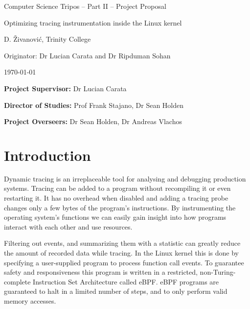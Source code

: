 \centerline{\Large Computer Science Tripos -- Part II -- Project Proposal}
\vspace{6mm}
\centerline{\Large Optimizing tracing instrumentation inside the Linux kernel}
\vspace{6mm}
\centerline{\large D. Živanović, Trinity College}
\vspace{4mm}
\centerline{\large Originator: Dr Lucian Carata and Dr Ripduman Sohan}
\vspace{4mm}
\centerline{\large \today}

\vspace{8mm}

\noindent
{\bf Project Supervisor:} Dr Lucian Carata
\vspace{2mm}

\noindent
{\bf Director of Studies:} Prof Frank Stajano, Dr Sean Holden
\vspace{2mm}
 
\noindent
{\bf Project Overseers:} Dr Sean Holden, Dr Andreas Vlachos



\section*{Introduction}

    Dynamic tracing is an irreplaceable tool for analysing and debugging production systems. Tracing can be added to a 
    program without recompiling it or even restarting it. It has no overhead when disabled and adding a tracing
    probe changes only a few bytes of the program's instructions.
    By instrumenting the operating system's functions we can easily gain insight into how programs interact 
    with each other and use resources.


    Filtering out events, and summarizing them with a statistic can greatly reduce the amount of recorded data
    while tracing. In the Linux kernel this is done by specifying a user-supplied program to process function call events. 
    To guarantee safety and responsiveness this program is written in a restricted, non-Turing-complete 
    Instruction Set Architecture called eBPF. eBPF programs are guaranteed to halt in a limited number of steps,
    and to only perform valid memory accesses.

